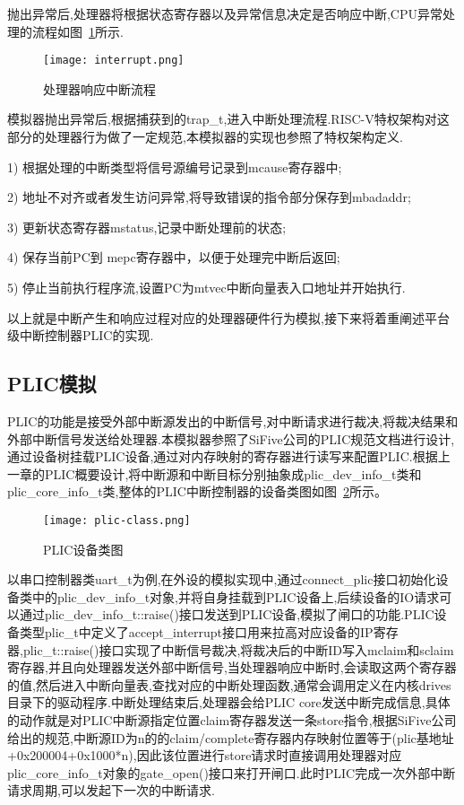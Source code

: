抛出异常后,处理器将根据状态寄存器以及异常信息决定是否响应中断,CPU异常处理的流程如图~\ref{fig:interrupt}所示.
\begin{figure}[H]
    \centering
    \texttt{[image: interrupt.png]}
    \caption{处理器响应中断流程}
    \label{fig:interrupt}
\end{figure}

模拟器抛出异常后,根据捕获到的trap\_t,进入中断处理流程.RISC-V特权架构对这部分的处理器行为做了一定规范,本模拟器的实现也参照了特权架构定义.


1) 根据处理的中断类型将信号源编号记录到mcause寄存器中;


2) 地址不对齐或者发生访问异常,将导致错误的指令部分保存到mbadaddr;


3) 更新状态寄存器mstatus,记录中断处理前的状态;


4) 保存当前PC到 mepc寄存器中，以便于处理完中断后返回;


5) 停止当前执行程序流,设置PC为mtvec中断向量表入口地址并开始执行.


以上就是中断产生和响应过程对应的处理器硬件行为模拟,接下来将着重阐述平台级中断控制器PLIC的实现.


\subsection{PLIC模拟}

PLIC的功能是接受外部中断源发出的中断信号,对中断请求进行裁决,将裁决结果和外部中断信号发送给处理器.本模拟器参照了SiFive公司的PLIC规范文档进行设计,通过设备树挂载PLIC设备,通过对内存映射的寄存器进行读写来配置PLIC.根据上一章的PLIC概要设计,将中断源和中断目标分别抽象成plic\_dev\_info\_t类和plic\_core\_info\_t类,整体的PLIC中断控制器的设备类图如图~\ref{fig:plic-class}所示。
\begin{figure}[H]
    \centering
    \texttt{[image: plic-class.png]}
    \caption{PLIC设备类图}
    \label{fig:plic-class}
\end{figure}
以串口控制器类uart\_t为例,在外设的模拟实现中,通过connect\_plic接口初始化设备类中的plic\_dev\_info\_t对象,并将自身挂载到PLIC设备上,后续设备的IO请求可以通过plic\_dev\_info\_t::raise()接口发送到PLIC设备,模拟了闸口的功能.PLIC设备类型plic\_t中定义了accept\_interrupt接口用来拉高对应设备的IP寄存器,plic\_t::raise()接口实现了中断信号裁决,将裁决后的中断ID写入mclaim和sclaim寄存器,并且向处理器发送外部中断信号,当处理器响应中断时,会读取这两个寄存器的值,然后进入中断向量表,查找对应的中断处理函数,通常会调用定义在内核drives目录下的驱动程序.中断处理结束后,处理器会给PLIC core发送中断完成信息,具体的动作就是对PLIC中断源指定位置claim寄存器发送一条store指令,根据SiFive公司给出的规范,中断源ID为n的的claim/complete寄存器内存映射位置等于(plic基地址+0x200004+0x1000*n),因此该位置进行store请求时直接调用处理器对应plic\_core\_info\_t对象的gate\_open()接口来打开闸口.此时PLIC完成一次外部中断请求周期,可以发起下一次的中断请求.




